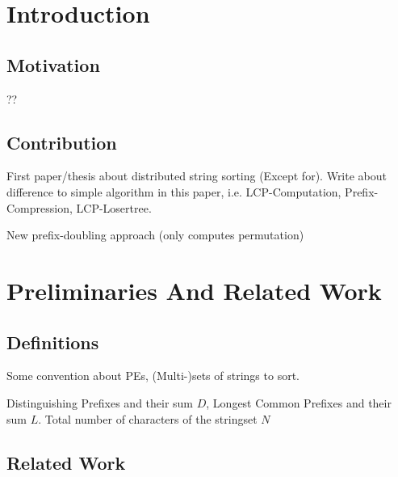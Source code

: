 \documentclass[12pt,a4paper,twoside]{scrartcl}
\numberwithin{equation}{section}
\begin{document}
\tableofcontents

\clearpage


\listoffigures
\listoftables
\listofalgorithms

\clearpage


\section{Introduction}

\subsection{Motivation}

??

\subsection{Contribution}

First paper/thesis about distributed string sorting (Except for\cite{fischer2019lightweight}). Write about difference to simple algorithm in this paper, i.e. LCP-Computation, Prefix-Compression, LCP-Losertree.

New prefix-doubling approach (only computes permutation) \cite{sanders2013communication}




\section{Preliminaries And Related Work}

\subsection{Definitions}

Some convention about PEs, (Multi-)sets of strings to sort.

Distinguishing Prefixes and their sum $D$, Longest Common Prefixes and their sum $L$. Total number of characters of the stringset $N$ 

\subsection{Related Work}
\end{document}
